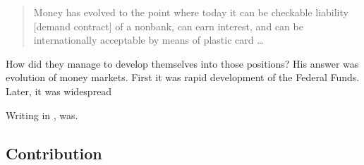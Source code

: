 \begin{quote}
Money has evolved to the point where today it can be checkable liability [demand contract] of a nonbank, can earn interest, and can be internationally acceptable by means of plastic card \dots~\citep{minsky1985_}
\end{quote} 

How did they manage to develop themselves into those positions? His answer was evolution of money markets. First it was rapid development of the Federal Funds. Later, it was widespread 

Writing in \citeyear{minsky1985_}, \citeauthor{minsky1985_} was.

\subsection{Contribution}

